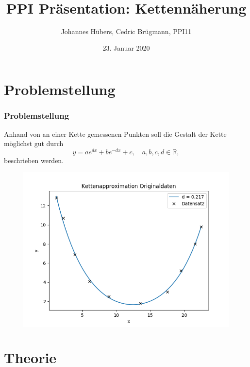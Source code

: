 \documentclass[a4paper, 11pt]{beamer}
\title{PPI Präsentation: Kettennäherung}
\author{Johannes Hübers, Cedric Brügmann, PPI11}
\date{23. Januar 2020}
\begin{document}
\begin{frame}
    \maketitle
\end{frame}

\begin{frame}
    \tableofcontents
\end{frame}



\section{Problemstellung}

\begin{frame}
    \frametitle{Problemstellung}

    Anhand von an einer Kette gemessenen Punkten soll die Gestalt der Kette möglichst gut durch
    $$y = ae^{dx} + be^{-dx} + c, \quad a,b,c,d\in\mathbb{R},$$
    beschrieben werden.

    \begin{figure}
        \includegraphics[scale=0.40]{kettenapproximation_originaldaten}
    \end{figure}
\end{frame}



\section{Theorie}

\newcommand{\R}{\left( \begin{array}{c} \hat{R}\\ 0 \end{array} \right)}
\end{document}
